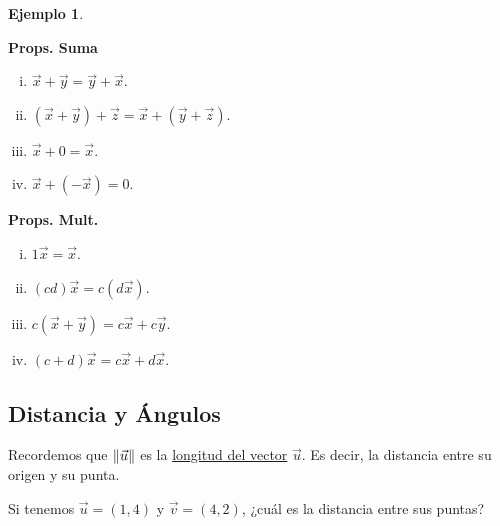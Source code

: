 \documentclass[12pt]{article}
\theoremstyle{plain}
\theoremstyle{definition}
\newtheorem{Ex}[Th]{Ejemplo}           %
\theoremstyle{remark}
\renewcommand{\:}{\colon}           %
\newcommand{\un}[1]{\underline{#1}}
\renewcommand{\.}{\Cdot}                %
\begin{document}
\begin{multicols}{2}
\begin{Ex}
\begin{center}
\begin{tikzpicture}[x=0.75pt,y=0.75pt,yscale=-1,xscale=1]
\end{tikzpicture}
  \end{center}
  \vspace{-1.5em}
\end{Ex}

\begin{multicols}{2}
  \textbf{Props. Suma}
  \begin{enumerate}[i)]
    \itemsep=-0.4em
    \item $\vec{x}+\vec{y}=\vec{y}+\vec x$.
    \item {\footnotesize{$(\vec{x}+\vec y)+\vec z=\vec x+(\vec y+\vec z)$.}}
    \item $\vec x+0=\vec x$.
    \item $\vec x+(-\vec x)=0$.
  \end{enumerate}
  \textbf{Props. Mult.}
  \begin{enumerate}[i)]
    \itemsep=-0.4em
    \item $1\vec{x}=\vec x$.
    \item $(cd)\vec x=c(d\vec x)$.
    \item $c(\vec x+\vec y)=c\vec x+c\vec y$.
    \item $(c+d)\vec x=c\vec x+d\vec x$.
  \end{enumerate}
\end{multicols}
\subsection*{Distancia y Ángulos}

Recordemos que $\norm{\vec{u}}$ es la \un{longitud del vector} $\vec u$. Es decir, la distancia entre su origen y su punta.\par Si tenemos $\vec{u}=(1,4)$ y $\vec v=(4,2)$, ¿cuál es la distancia entre sus puntas?
\vspace{-0.6em}
\begin{center}
\begin{tikzpicture}[x=0.75pt,y=0.75pt,yscale=-1,xscale=1]


\end{tikzpicture}
\end{center}
\end{multicols}
\end{document}

